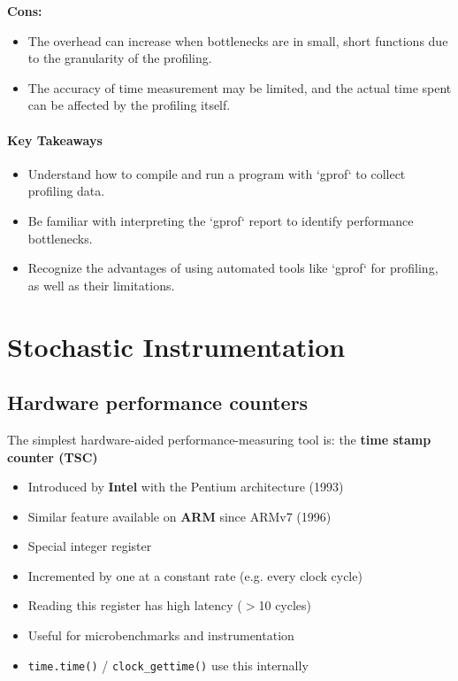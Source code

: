 \documentclass[12pt]{article}
\begin{document}
\textbf{Cons:}
\begin{itemize}
    \item The overhead can increase when bottlenecks are in small, short functions due to the granularity of the profiling.
    \item The accuracy of time measurement may be limited, and the actual time spent can be affected by the profiling itself.
\end{itemize}

\paragraph{Key Takeaways}
\begin{itemize}
    \item Understand how to compile and run a program with `gprof` to collect profiling data.
    \item Be familiar with interpreting the `gprof` report to identify performance bottlenecks.
    \item Recognize the advantages of using automated tools like `gprof` for profiling, as well as their limitations.
\end{itemize}






















\newpage
\section{Stochastic Instrumentation}

\subsection{Hardware performance counters}

The simplest hardware-aided performance-measuring tool is:
the \textbf{time stamp counter (TSC)}
\begin{itemize}
    \item Introduced by \textbf{Intel} with the Pentium architecture (1993)
    \item Similar feature available on \textbf{ARM} since ARMv7 (1996)
    \item Special integer register
    \item Incremented by one at a constant rate (e.g. every clock cycle)
    \item Reading this register has high latency ($>$10 cycles)
    \item Useful for microbenchmarks and instrumentation
    \item \texttt{time.time()} / \texttt{clock\_gettime()} use this internally
\end{itemize}
\end{document}
